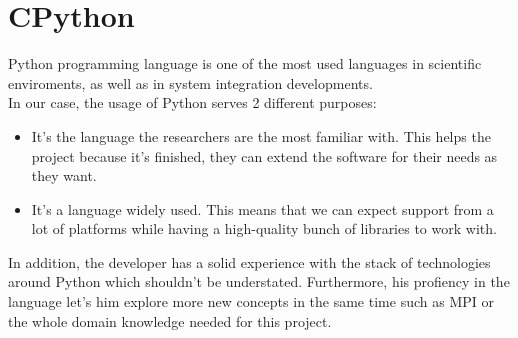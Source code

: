 \section{CPython}

Python\cite{Python} programming language is one of the most used languages
in scientific enviroments, as well as in system integration developments.\\

In our case, the usage of Python serves 2 different purposes:
\begin{itemize}
  \item It's the language the researchers are the most familiar with. This
  helps the project because it's finished, they can extend the
  software for their needs as they want.
  \item It's a language widely used. This means that we can expect support from
  a lot of platforms while having a high-quality bunch of libraries to work
  with.
\end{itemize}


In addition, the developer has a solid experience with the stack of
technologies around Python which shouldn't be understated. Furthermore, his
profiency in the language let's him explore more new concepts in the same time
such as MPI or the whole domain knowledge needed for this project.\\
